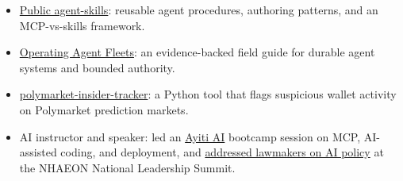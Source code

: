 \begin{itemize}
  \item \href{https://github.com/selamy-labs/agent-skills}{Public agent-skills}: reusable agent procedures, authoring patterns, and an MCP-vs-skills framework.
  \item \href{https://github.com/pselamy/operating-agent-fleets}{Operating Agent Fleets}: an evidence-backed field guide for durable agent systems and bounded authority.
  \item \href{https://github.com/pselamy/polymarket-insider-tracker}{polymarket-insider-tracker}: a Python tool that flags suspicious wallet activity on Polymarket prediction markets.
  \item AI instructor and speaker: led an \href{https://www.ayiti.ai/en/training}{Ayiti AI} bootcamp session on MCP, AI-assisted coding, and deployment, and \href{https://www.linkedin.com/posts/patrickselamy_ai-publicpolicy-leadership-activity-7423430343493505025-nuPe}{addressed lawmakers on AI policy} at the NHAEON National Leadership Summit.
\end{itemize}
